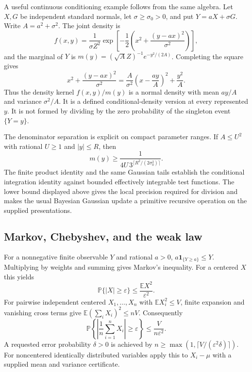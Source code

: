 A useful continuous conditioning example follows from the same algebra.
Let $X,G$ be independent standard normals, let $\sigma\geq\sigma_0>0$, and
put $Y=aX+\sigma G$.  Write $A=a^2+\sigma^2$.  The joint density is
\[
 f(x,y)=\frac1{\sigma Z^2}
  \exp\!\left[-\frac12\left(x^2+\frac{(y-ax)^2}{\sigma^2}\right)\right],
\]
and the marginal of $Y$ is
$m(y)=(\sqrt A Z)^{-1}e^{-y^2/(2A)}$.  Completing the square gives
\[
 x^2+\frac{(y-ax)^2}{\sigma^2}
 =\frac{A}{\sigma^2}\left(x-\frac{ay}{A}\right)^2+\frac{y^2}{A}.
\]
Thus the density kernel $f(x,y)/m(y)$ is a normal density with mean
$ay/A$ and variance $\sigma^2/A$.  It is a defined conditional-density
version at every represented $y$.  It is not formed by dividing by the
zero probability of the singleton event $\{Y=y\}$.

The denominator separation is explicit on compact parameter ranges.
If $A\leq U^2$ with rational $U\geq1$ and $|y|\leq R$, then
\[
 m(y)\geq
 \frac1{4U\,3^{\lceil R^2/(2\sigma_0^2)\rceil}}.
\]
The finite product identity and the same Gaussian tails establish the
conditional integration identity against bounded effectively integrable
test functions.  The lower bound displayed above gives the local precision
required for division and makes the usual Bayesian Gaussian update a
primitive recursive operation on the supplied presentations.

\subsection{Markov, Chebyshev, and the weak law}

For a nonnegative finite observable $Y$ and rational $a>0$,
$a\mathbf1_{\{Y\geq a\}}\leq Y$.  Multiplying by weights and summing gives
Markov's inequality.  For a centered $X$ this yields
\[
 \mathbb P\{|X|\geq\varepsilon\}
 \leq\frac{\mathbb E X^2}{\varepsilon^2}.
\]
For pairwise independent centered $X_1,\ldots,X_n$ with
$\mathbb E X_i^2\leq V$, finite expansion and vanishing cross terms give
$\mathbb E(\sum_iX_i)^2\leq nV$.  Consequently
\begin{equation}
 \mathbb P\!\left\{\left|\frac1n\sum_{i=1}^nX_i\right|
                \geq\varepsilon\right\}
 \leq\frac{V}{n\varepsilon^2}.
 \label{eq:weak-law}
\end{equation}
A requested error probability $\delta>0$ is achieved by
$n\geq\max(1,\lceil V/(\varepsilon^2\delta)\rceil)$.
For noncentered identically distributed variables apply this to
$X_i-\mu$ with a supplied mean and variance certificate.

